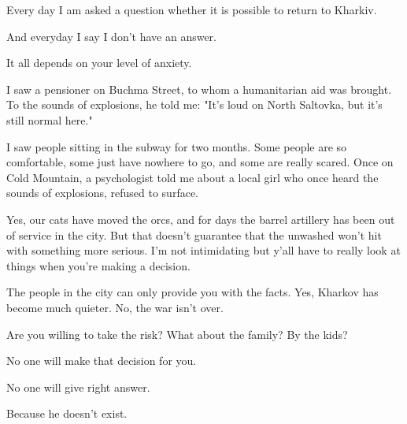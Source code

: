  
 
 
 
 

Every day I am asked a question whether it is possible to return to Kharkiv.

And everyday I say I don't have an answer.

It all depends on your level of anxiety.

I saw a pensioner on Buchma Street, to whom a humanitarian aid was brought. To
the sounds of explosions, he told me: "It's loud on North Saltovka, but it's
still normal here."

I saw people sitting in the subway for two months. Some people are so
comfortable, some just have nowhere to go, and some are really scared. Once on
Cold Mountain, a psychologist told me about a local girl who once heard the
sounds of explosions, refused to surface.

Yes, our cats have moved the orcs, and for days the barrel artillery has been
out of service in the city. But that doesn't guarantee that the unwashed won't
hit with something more serious. I’m not intimidating but y’all have to really
look at things when you’re making a decision.

The people in the city can only provide you with the facts. Yes, Kharkov has
become much quieter. No, the war isn't over.

Are you willing to take the risk? What about the family? By the kids?

No one will make that decision for you.

No one will give right answer.

Because he doesn't exist.

